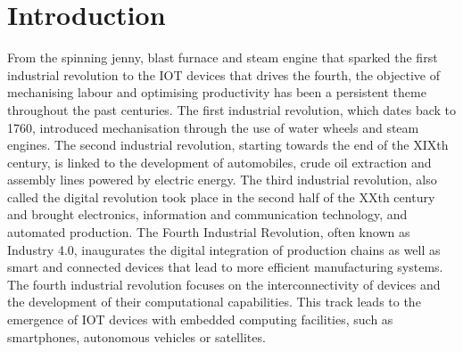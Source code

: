 \chapter{Introduction}\label{chap:intro}




From the spinning jenny, blast furnace and steam engine that sparked the first
industrial revolution to the \ac{IOT} devices that drives the fourth, the
objective of mechanising labour and optimising productivity has been a
persistent theme throughout the past centuries. The first industrial revolution,
which dates back to 1760, introduced mechanisation through the use of water
wheels and steam engines. The second industrial revolution, starting towards the
end of the \textsc{XIX}th century, is linked to the development of automobiles, crude oil
extraction and assembly lines powered by electric energy. The third industrial
revolution, also called the digital revolution took place in the second half of
the \textsc{XX}th century and brought electronics, information and communication
technology, and automated production. The Fourth Industrial Revolution, often
known as Industry 4.0, inaugurates the digital integration of production chains
as well as smart and connected devices that lead to more efficient manufacturing
systems. The fourth industrial revolution focuses on the interconnectivity of
devices and the development of their computational capabilities. This track
leads to the emergence of \ac{IOT} devices with embedded computing facilities,
such as smartphones, autonomous vehicles or satellites.\\


